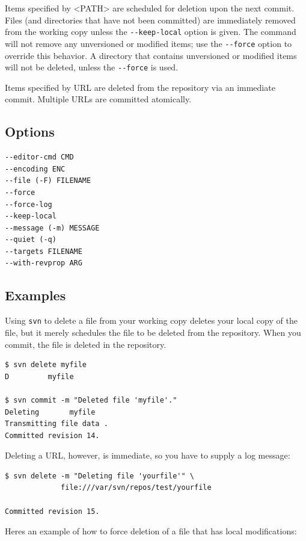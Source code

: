 Items specified by \textless PATH\textgreater{} are scheduled for
deletion upon the next commit. Files (and directories that have not been
committed) are immediately removed from the working copy unless the
\texttt{-\/-keep-local} option is given. The command will not remove any
unversioned or modified items; use the \texttt{-\/-force} option to
override this behavior. A directory that contains unversioned or
modified items will not be deleted, unless the \texttt{-\/-force} is
used.

Items specified by URL are deleted from the repository via an immediate
commit. Multiple URLs are committed atomically.

\subsection{Options}

\begin{verbatim}
--editor-cmd CMD
--encoding ENC
--file (-F) FILENAME
--force
--force-log
--keep-local
--message (-m) MESSAGE
--quiet (-q)
--targets FILENAME
--with-revprop ARG
\end{verbatim}

\subsection{Examples}

Using \texttt{svn} to delete a file from your working copy deletes your
local copy of the file, but it merely schedules the file to be deleted
from the repository. When you commit, the file is deleted in the
repository.

\begin{verbatim}
$ svn delete myfile
D         myfile

$ svn commit -m "Deleted file 'myfile'."
Deleting       myfile
Transmitting file data .
Committed revision 14.
\end{verbatim}

Deleting a URL, however, is immediate, so you have to supply a log
message:

\begin{verbatim}
$ svn delete -m "Deleting file 'yourfile'" \
             file:///var/svn/repos/test/yourfile

Committed revision 15.
\end{verbatim}

Here\textquotesingle s an example of how to force deletion of a file
that has local modifications:


